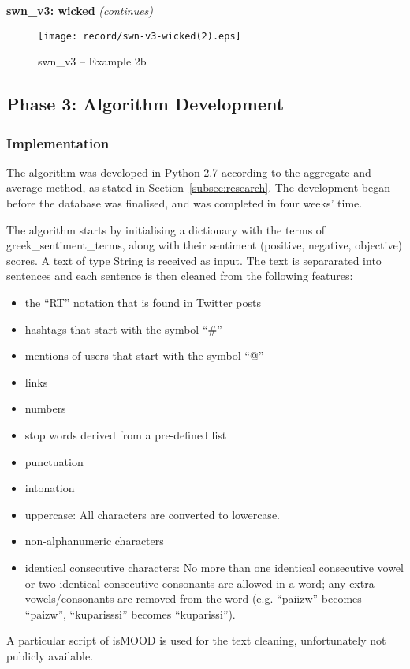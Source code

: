\clearpage

\textbf{swn\_v3: wicked} \textit{(continues)} \\

\begin{figure}[ht]
\centering
\texttt{[image: record/swn-v3-wicked(2).eps]}
\caption{swn\_v3 -- Example 2b}
\label{fig:swn-wicked2}
\end{figure}

\clearpage

\subsection{Phase 3: Algorithm Development}
\label{subsec:algorithm}

\subsubsection{Implementation}
\label{subsubsec:algimplementation}

The algorithm was developed in Python 2.7
according to the aggregate-and-average method,
as stated in Section~\ref{subsec:research}.
The development began before the database was finalised,
and was completed in four weeks' time.

The algorithm starts by initialising a dictionary
with the terms of greek\_sentiment\_terms,
along with their sentiment (positive, negative, objective) scores.
A text of type String is received as input.
The text is separarated into sentences
and each sentence is then cleaned from the following features:

\begin{itemize}
 \item the ``RT'' notation that is found in Twitter posts
 \item hashtags that start with the symbol ``\#''
 \item mentions of users that start with the symbol ``@''
 \item links
 \item numbers
 \item stop words derived from a pre-defined list
 \item punctuation
 \item intonation
 \item uppercase: All characters are converted to lowercase.
 \item non-alphanumeric characters
 \item identical consecutive characters:
 No more than one identical consecutive vowel
 or two identical consecutive consonants are allowed in a word;
 any extra vowels/consonants are removed from the word
 (e.g. ``\textgreek{paiizw}'' becomes ``\textgreek{paizw}'',
 ``\textgreek{kuparisssi}'' becomes ``\textgreek{kuparissi}'').
\end{itemize}
A particular script of isMOOD is used for the text cleaning,
unfortunately not publicly available.

